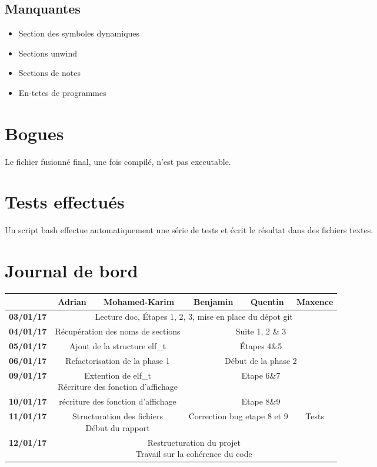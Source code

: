 \documentclass[10pt,oneside]{article}   %
\begin{document}
	\subsection{Manquantes}
		\begin{itemize}
			\item Section des symboles dynamiques
			\item Sections unwind
			\item Sections de notes
			\item En-tetes de programmes
		\end{itemize}

\section{Bogues}
	Le fichier fusionné final, une fois compilé, n'est pas executable.


\section{Tests effectués}
	Un script bash effectue automatiquement une série de tests et écrit le résultat dans des fichiers textes.

\section{Journal de bord}

	\tabcolsep=0.11cm
	\begin{tabular}{| c || *{4}{c|} c |}
		\hline
		& Adrian & Mohamed-Karim & Benjamin & Quentin & Maxence \\
		\hline
		\bf{03/01/17} & \multicolumn{5}{c|}{Lecture doc, Étapes 1, 2, 3, mise en place du dépot git}\\
		\hline
		\bf{04/01/17} & \multicolumn{2}{c|}{Récupération des noms de sections} & \multicolumn{3}{c|}{Suite 1, 2 \& 3} \\
		\hline
		\bf{05/01/17} & \multicolumn{2}{c|}{Ajout de la structure elf\_t} & \multicolumn{3}{c|}{Étapes 4\&5} \\
		\hline
		\bf{06/01/17} & \multicolumn{2}{c|}{Refactorisation de la phase 1} & \multicolumn{3}{c|}{Début de la phase 2} \\
		\hline
		\bf{09/01/17} & \multicolumn{2}{c|}{\parbox[t]{5cm}{Extention de elf\_t\\Récriture des fonction d'affichage}} & \multicolumn{3}{c|}{Etape 6\&7} \\
		\hline
		\bf{10/01/17} & \multicolumn{2}{c|}{récriture des fonction d'affichage} & \multicolumn{3}{c|}{Etape 8\&9} \\
		\hline
		\bf{11/01/17} & \multicolumn{2}{c|}{\parbox[t]{5cm}{Structuration des fichiers\\ Début du rapport}} & \multicolumn{2}{c|}{Correction bug etape 8 et 9} & Tests\\
		\hline
		\bf{12/01/17} & \multicolumn{5}{c|}{\parbox[t]{5cm}{Restructuration du projet\\Travail sur la cohérence du code} }\\
		\hline
	\end{tabular}
\end{document}
